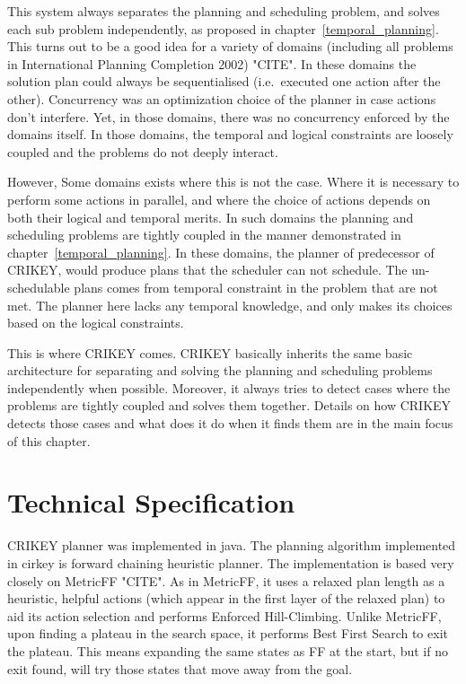 \documentclass
[a4paper
,english
,parskip=half
,bibliography=totoc
]{scrreprt}
\begin{document}
    This system always separates the planning and scheduling problem, and solves each sub problem independently, as proposed in chapter~\ref{temporal_planning}. This turns out to be a good idea for a variety of domains (including all problems in International Planning Completion 2002) "CITE". In these domains the solution plan could always be sequentialised (i.e.\ executed one action after the other). Concurrency was an optimization choice of the planner in case actions don't interfere. Yet, in those domains, there was no concurrency enforced by the domains itself. In those domains, the temporal and logical constraints are loosely coupled and the problems do not deeply interact. 

    However, Some domains exists where this is not the case. Where it is necessary to perform some actions in parallel, and where the choice of actions depends on both their logical and temporal merits. In such domains the planning and scheduling problems are tightly coupled in the manner demonstrated in chapter~\ref{temporal_planning}. In these domains, the planner of predecessor of CRIKEY, would produce plans that the scheduler can not schedule. The un-schedulable plans comes from temporal constraint in the problem that are not met. The planner here lacks any temporal knowledge, and only makes its choices based on the logical constraints.

    This is where CRIKEY comes. CRIKEY basically inherits the same basic architecture for separating and solving the planning and scheduling problems independently when possible. Moreover, it always tries to detect cases where the problems are tightly coupled and solves them together. Details on how CRIKEY detects those cases and what does it do when it finds them are in the main focus of this chapter.

    \section{Technical Specification} \label{tech}
    CRIKEY planner was implemented in java.
    The planning algorithm implemented in cirkey is forward chaining heuristic planner.
    The implementation is based very closely on MetricFF "CITE".
    As in MetricFF, it uses a relaxed plan length as a heuristic, helpful actions (which appear in the first layer of the relaxed plan) to aid its action selection and performs Enforced Hill-Climbing.
    Unlike MetricFF, upon finding a plateau in the search space, it performs Best First Search to exit the plateau.
    This means expanding the same states as FF at the start, but if no exit found, will try those states that move away from the goal.
\end{document}
